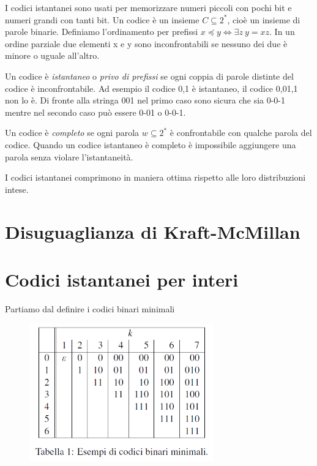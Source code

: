 \documentclass[12pt,italian]{report}
\begin{document}
I codici istantanei sono usati per memorizzare numeri piccoli con pochi bit e numeri grandi con tanti bit. 
Un codice è un insieme $ C \subseteq 2^* $, cioè un insieme di parole binarie. Definiamo l'ordinamento per prefissi $ x \preceq y \iff \exists z \: y = xz $. In un ordine parziale due elementi x e y sono inconfrontabili se nessuno dei due è minore o uguale all'altro.

Un codice è \textit{istantaneo} o \textit{privo  di prefissi} se ogni coppia di parole distinte del codice è inconfrontabile. Ad esempio il codice {0,1} è istantaneo, il codice {0,01,1} non lo è. Di fronte alla stringa 001 nel primo caso sono sicura che sia 0-0-1 mentre nel secondo caso può essere 0-01 o 0-0-1.

Un codice è \textit{completo} se ogni parola $ w \subseteq 2^* $ è confrontabile con qualche parola del codice. Quando un codice istantaneo è completo è impossibile aggiungere una parola senza violare l'istantaneità.

I codici istantanei comprimono in maniera ottima rispetto alle loro distribuzioni intese.

\section{Disuguaglianza di Kraft-McMillan}
\label{Disuguaglianza di Kraft-McMillan}
\clearpage

\section{Codici istantanei per interi}
\label{Codici istantanei per interi}
Partiamo dal definire i codici binari minimali

\begin{figure}[h]
	\centering
	\includegraphics[width=80mm]{image/cod_minimali.png}
	\label{fig:cod_minimali}
\end{figure}
\end{document}
